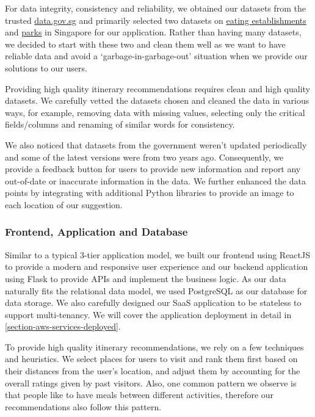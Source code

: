 \documentclass[12pt,a4paper]{article}
\begin{document}
        For data integrity, consistency and reliability, we obtained our datasets from the trusted \url{data.gov.sg} and primarily selected two datasets on \href{https://data.gov.sg/dataset/eating-establishments}{eating establishments} and \href{https://data.gov.sg/dataset/parks}{parks} in Singapore for our application. Rather than having many datasets, we decided to start with these two and clean them well as we want to have reliable data and avoid a ‘garbage-in-garbage-out’ situation when we provide our solutions to our users.

        Providing high quality itinerary recommendations requires clean and high quality datasets. We carefully vetted the datasets chosen and cleaned the data in various ways, for example, removing data with missing values, selecting only the critical fields/columns and renaming of similar words for consistency.
        
        We also noticed that datasets from the government weren’t updated periodically and some of the latest versions were from two years ago. Consequently, we provide a feedback button for users to provide new information and report any out-of-date or inaccurate information in the data. We further enhanced the data points by integrating with additional Python libraries to provide an image to each location of our suggestion.


        \subsubsection{Frontend, Application and Database}
        
        Similar to a typical 3-tier application model, we built our frontend using ReactJS to provide a modern and responsive user experience and our backend application using Flask to provide APIs and implement the business logic. As our data naturally fits the relational data model, we used PostgreSQL as our database for data storage. We also carefully designed our SaaS application to be stateless to support multi-tenancy. We will cover the application deployment in detail in \autoref{section-aws-services-deployed}.

        To provide high quality itinerary recommendations, we rely on a few techniques and heuristics. We select places for users to visit and rank them first based on their distances from the user’s location, and adjust them by accounting for the overall ratings given by past visitors. Also, one common pattern we observe is that people like to have meals between different activities, therefore our recommendations also follow this pattern.
\end{document}
